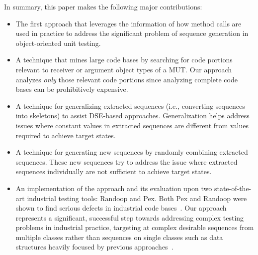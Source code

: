 In summary, this paper makes the following major contributions:
\begin{itemize}
\item The first approach that leverages the information of how method calls are used in practice to address the significant problem of sequence generation in object-oriented unit testing.
\item A technique that mines large code bases by searching for code portions relevant to receiver or argument object types of a MUT. Our approach analyzes \emph{only} those relevant code portions since analyzing complete code bases can be prohibitively expensive. 
\item A technique for generalizing extracted sequences (i.e., converting sequences into skeletons) to assist DSE-based approaches. Generalization helps address issues where constant values in extracted sequences are different from values required to achieve target states.
\item A technique for generating new sequences by randomly combining extracted sequences. These new sequences try to address the issue where extracted sequences individually are not sufficient to achieve target states.
\item An implementation of the approach and its evaluation upon two state-of-the-art industrial testing tools: Randoop and Pex. Both Pex and Randoop were shown to find serious defects in industrial code bases~\cite{pacheco:feedback, tillman:pexwhite}. Our approach represents a significant, successful step towards addressing complex testing problems in industrial practice, targeting at complex desirable sequences from multiple classes rather than sequences on single classes such as data structures heavily focused by previous approaches~\cite{tonella:etoc,  inkumsah08:improving}.

\end{itemize}
